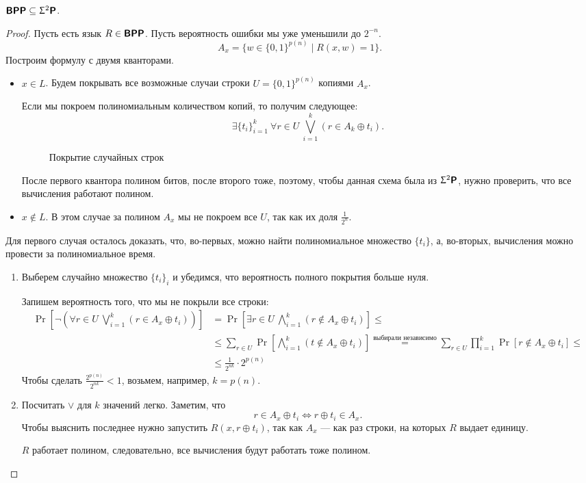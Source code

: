 \begin{thm}
	$ \textmd{\textbf{\textsf{BPP}}} \subseteq \Upsigma^2\textmd{\textbf{\textsf{P}}}$.
\end{thm}
\begin{proof}
	Пусть есть язык $ R \in \textmd{\textbf{\textsf{BPP}}}$. Пусть вероятность ошибки мы уже уменьшили до $ 2^{-n}$.
	\[
		A_x = \{w \in \{0, 1\}^{p(n)} \mid R(x, w) = 1\}
	.\]
	Построим формулу с двумя кванторами.

	\begin{itemize}
		\item $ x \in L$.
			Будем покрывать все возможные случаи строки $ U = \{0, 1\}^{p(n)}$ копиями $ A_x$.

			Если мы покроем полиномиальным количеством копий, то получим следующее:
			\[
				\exists \{t_{i}\}_{i=1}^{k} ~ \forall r \in U ~ \bigvee_{i=1}^{k} (r \in A_k \oplus t_i)
			.\]
			\begin{figure}[ht]
				\centering
				\caption{Покрытие случайных строк}
				\label{fig:copy-ax}
			\end{figure}
			После первого квантора полином битов, после второго тоже, поэтому, чтобы данная схема была из $ \Upsigma^2\textmd{\textbf{\textsf{P}}}$, нужно проверить, что все вычисления работают полином.
		\item $ x \notin L$.
			В этом случае за полином $ A_x$ мы не покроем все $ U$, так как их доля $ \frac{1}{2^{n}}$.
	\end{itemize}
	Для первого случая осталось доказать, что, во-первых, можно найти полиномиальное множество $ \{t_i\}$, а, во-вторых, вычисления можно провести за полиномиальное время.
	\begin{enumerate}
	    \item 
			Выберем случайно множество $ \{t_i\}_{i}$ и убедимся, что вероятность полного покрытия больше нуля.

			Запишем вероятность того, что мы не покрыли все строки:
			\[
			\begin{aligned}
				\Pr \left[ \neg \left( \forall r \in U ~\bigvee_{i=1}^{k}(r \in A_x \oplus t_i) \right)  \right] &= \Pr \left[ \exists r \in U ~ \bigwedge_{i=1}^{k}\left( r \notin A_x \oplus t_i \right)  \right] \le \\
																												 & \le \sum_{r \in U}^{} \Pr \left[ \bigwedge_{i=1}^{k} (t \notin A_x \oplus t_i) \right]  \stackrel{\text{выбирали независимо}}{=} \sum_{r \in U}^{} \prod_{i=1}^{k} \Pr [r \notin A_x \oplus t_i] \le \\
																												 & \le \frac{1}{2^{nk}}\cdot 2 ^{p(n)}
			\end{aligned}
			\]
			Чтобы сделать $ \frac{2^{p(n)}}{2^{nk}} < 1$, возьмем, например, $k= p(n)$.
		\item Посчитать $ \vee$ для $ k$ значений легко. 
			Заметим, что 
			\[
			r \in A_x \oplus t_i \Longleftrightarrow r \oplus t_i \in A_x
			.\] 
			Чтобы выяснить последнее нужно запустить $ R(x, r \oplus t_i)$, так как $ A_x$ --- как раз строки, на которых $ R$ выдает  единицу.

			$ R$ работает полином, следовательно, все вычисления будут работать тоже полином.
	\end{enumerate} 
\end{proof}
